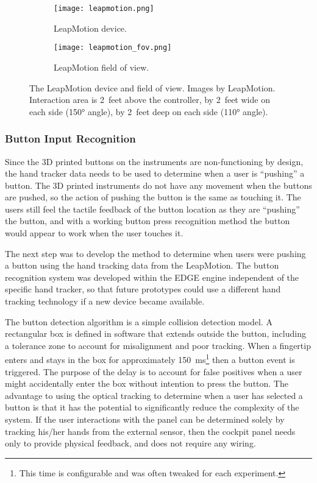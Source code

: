 \mbox{}\hfill
\begin{figure}
    \centering
    \begin{subfigure}[t]{0.49\linewidth}
        \centering
        \texttt{[image: leapmotion.png]}
        \caption{LeapMotion device.}
        \label{fig:proto_leap_device}
    \end{subfigure}\hfill
    \begin{subfigure}[t]{0.49\linewidth}
        \centering
        \texttt{[image: leapmotion\_fov.png]}
        \caption{LeapMotion field of view.}
        \label{fig:proto_leap_fov}
    \end{subfigure}
    \caption{The LeapMotion device and field of view. Images by LeapMotion. Interaction area is \num{2}~feet above the controller, by \num{2}~feet wide on each side (\ang{150} angle), by \num{2}~feet deep on each side (\ang{110} angle).}
    \label{fig:proto_leap}
\end{figure}
\hfill\mbox{}

\subsubsection{Button Input Recognition}
\label{sec:proto_button_input}

Since the 3D printed buttons on the instruments are non-functioning by design, the hand tracker data needs to be used to determine when a user is ``pushing'' a button.
The 3D printed instruments do not have any movement when the buttons are pushed, so the action of pushing the button is the same as touching it.
The users still feel the tactile feedback of the button location as they are ``pushing'' the button, and with a working button press recognition method the button would appear to work when the user touches it.

The next step was to develop the method to determine when users were pushing a button using the hand tracking data from the LeapMotion.
The button recognition system was developed within the EDGE engine independent of the specific hand tracker, so that future prototypes could use a different hand tracking technology if a new device became available.

The button detection algorithm is a simple collision detection model.
A rectangular box is defined in software that extends outside the button, including a tolerance zone to account for misalignment and poor tracking.
When a fingertip enters and stays in the box for approximately \SI{150}{\milli\second}\footnote{This time is configurable and was often tweaked for each experiment.} then a button event is triggered.
The purpose of the delay is to account for false positives when a user might accidentally enter the box without intention to press the button.
The advantage to using the optical tracking to determine when a user has selected a button is that it has the potential to significantly reduce the complexity of the system.
If the user interactions with the panel can be determined solely by tracking his/her hands from the external sensor, then the cockpit panel needs only to provide physical feedback, and does not require any wiring.

